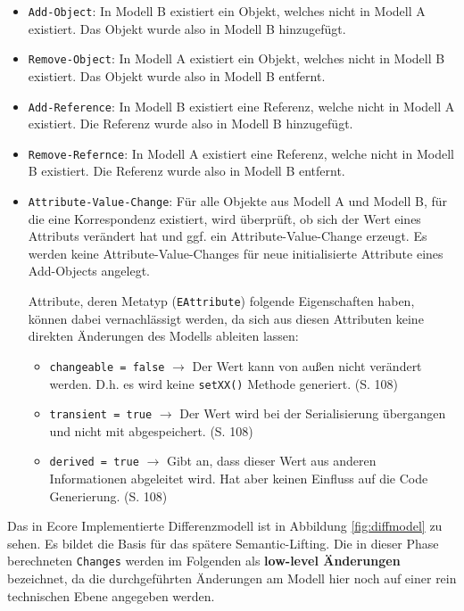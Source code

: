 \begin{itemize}
  \item \texttt{Add-Object}: In Modell B existiert ein Objekt, welches nicht in Modell A existiert.
  Das Objekt wurde also in Modell B hinzugefügt.
  
  \item \texttt{Remove-Object}: In Modell A existiert ein Objekt, welches nicht in Modell B
  existiert. Das Objekt wurde also in Modell B entfernt.
  
  \item \texttt{Add-Reference}: In Modell B existiert eine Referenz, welche nicht in Modell A
  existiert. Die Referenz wurde also in Modell B hinzugefügt.
  
  \item \texttt{Remove-Refernce}: In Modell A existiert eine Referenz, welche nicht in Modell B
  existiert. Die Referenz wurde also in Modell B entfernt.
  
  \item \texttt{Attribute-Value-Change}: Für alle Objekte aus Modell A und Modell B, für die eine
  Korrespondenz existiert, wird überprüft, ob sich der Wert eines Attributs verändert hat und ggf.
  ein Attribute-Value-Change erzeugt. Es werden keine Attribute-Value-Changes für neue
  initialisierte Attribute eines Add-Objects angelegt.
  
  Attribute, deren Metatyp (\texttt{EAttribute}) folgende Eigenschaften haben, können dabei
  vernachlässigt werden, da sich aus diesen Attributen keine direkten Änderungen des Modells
  ableiten lassen:
  
  \begin{itemize}
    \item\texttt{changeable = false} $\to$ Der Wert kann von außen nicht verändert werden. D.h. es
    wird keine \texttt{setXX()} Methode generiert. \cite{SBPM2009} (S. 108)
    
    \item\texttt{transient = true} $\to$  Der Wert wird bei der Serialisierung übergangen und nicht
    mit abgespeichert. \cite{SBPM2009} (S. 108)
    
    \item \texttt{derived = true} $\to$ Gibt an, dass dieser Wert aus anderen Informationen
    abgeleitet wird. Hat aber keinen Einfluss auf die Code Generierung. \cite{SBPM2009} (S. 108)
  \end{itemize}
\end{itemize}
Das in Ecore Implementierte Differenzmodell ist in Abbildung \ref{fig:diffmodel} zu sehen. Es bildet
die Basis für das spätere Semantic-Lifting. Die in dieser Phase berechneten \texttt{Changes} werden
im Folgenden als \textbf{low-level Änderungen} bezeichnet, da die durchgeführten Änderungen am
Modell hier noch auf einer rein technischen Ebene angegeben werden.

